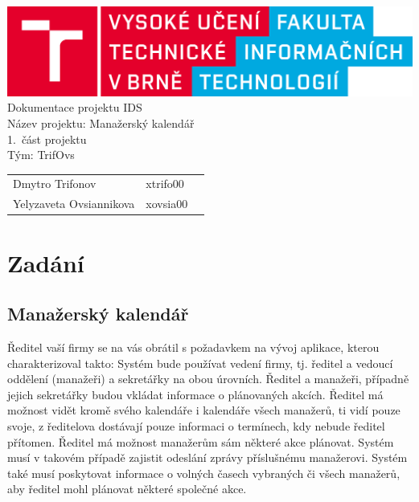 \documentclass[11pt,a4paper]{article}
\begin{document}
    \begin{titlepage}
        \begin{center}
            \includegraphics[width=1\linewidth]{fit_logo.png} \\
            \Huge{Dokumentace projektu IDS} \\
            \Large{Název projektu: Manažerský kalendář } \\
            \LARGE{1.~část projektu} \\
            \Large{Tým: TrifOvs } \\
        \end{center}
        \hfill
        \begin{center}
        \LARGE
            \begin{tabular}{l  l  l}
                Dmytro Trifonov & xtrifo00 & \;  \\
                Yelyzaveta Ovsiannikova & xovsia00 & \;
            \end{tabular}
        \end{center}
    \end{titlepage}
    \tableofcontents

    \newpage

    \section{Zadání}
    \subsection*{Manažerský kalendář}
    Ředitel vaší firmy se na vás obrátil s požadavkem na vývoj aplikace, kterou charakterizoval takto:
    Systém bude používat vedení firmy, tj. ředitel a vedoucí oddělení (manažeři) a sekretářky na obou úrovních. Ředitel a manažeři, případně jejich sekretářky budou vkládat informace o plánovaných akcích. Ředitel má možnost vidět kromě svého kalendáře i kalendáře všech manažerů, ti vidí pouze svoje, z ředitelova dostávají pouze informaci o termínech, kdy nebude ředitel přítomen. Ředitel má možnost manažerům sám některé akce plánovat. Systém musí v takovém případě zajistit odeslání zprávy příslušnému manažerovi. Systém také musí poskytovat informace o volných časech vybraných či všech manažerů, aby ředitel mohl plánovat některé společné akce.
\end{document}
